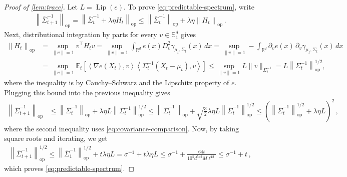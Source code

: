\documentclass[11pt]{article}
\newcommand{\R}{\mathbb R}
\newcommand{\E}{\mathbb E}
\newcommand{\Lip}{\operatorname{Lip}}
\newcommand{\op}{\mathrm{op}}
\newcommand{\1}{\mathbf 1}
\newcommand{\ip}[2]{\left\langle #1,#2\right\rangle}
\newcommand{\norm}[1]{\left\lVert #1\right\rVert}
\begin{document}
\begin{proof}[Proof of \cref{lem:trace}]
    Let $L=\Lip(e)$.
    To prove \eqref{eq:predictable-spectrum}, write
    \begin{align}
        \norm{\overline\Sigma_{t+1}^{-1}}_{\op}
        =
        \norm{\overline\Sigma_{t}^{-1} + \lambda\eta H_t}_{\op}
        \leq
        \norm{\overline\Sigma_{t}^{-1}}_{\op} + \lambda\eta\norm{H_t}_{\op}\,.
    \end{align}
    Next, distributional integration by parts for every $v\in\mathbb{S}_1^d$ gives
    \begin{align}
        \norm{H_t}_{\op}
         & =
        \sup_{\|v\|=1} v^\top H_t v
        =
        \sup_{\|v\|=1}
        \int_{\R^d}e(x) D^2_v\gamma_{\mu_t,\Sigma_t}(x)\,dx
        =
        \sup_{\|v\|=1}
        -\int_{\R^d}\partial_ve(x)\,
        \partial_v\gamma_{\mu_t,\Sigma_t}(x)\,dx
        \\
         & =
        \sup_{\|v\|=1}
        \E_t\left[
            \ip{\nabla e(X_t)}{v}
            \ip{\Sigma_t^{-1}(X_t-\mu_t)}{v}
            \right]
        \leq
        \sup_{\|v\|=1}
        L \|v\|_{\Sigma_t^{-1}}
        =
        L \norm{\Sigma_t^{-1}}_{\op}^{1/2},
        \label{eq:H-quadratic-bound}
    \end{align}
    where the inequality is by Cauchy--Schwarz and the Lipschitz property of $e$.
    Plugging this bound into the previous inequality gives
    \begin{align}
        \norm{\overline\Sigma_{t+1}^{-1}}_{\op}
         & \leq
        \norm{\overline\Sigma_{t}^{-1}}_{\op} + \lambda\eta L \norm{\Sigma_t^{-1}}_{\op}^{1/2}
        \leq
        \norm{\overline\Sigma_{t}^{-1}}_{\op} + \sqrt{\frac{3}{2}}\lambda\eta L\norm{\overline\Sigma_{t}^{-1}}_{\op}^{1/2}
        \leq
        \left(\norm{\overline\Sigma_{t}^{-1}}_{\op}^{1/2} + \lambda\eta L\right)^2\,,
        \label{eq:predictable-spectrum-bound}
    \end{align}
    where the second inequality uses \eqref{eq:covariance-comparison}.
    Now, by taking square roots and iterating, we get
    \begin{align}
        \norm{\overline\Sigma_{t+1}^{-1}}_{\op}^{1/2}
        \leq
        \norm{\overline\Sigma_1^{-1}}_{\op}^{1/2} + t\lambda\eta L
        = \sigma^{-1}+t\lambda\eta L
        \leq
        \sigma^{-1}
        +\frac{64t}{10^5d^{5/2}M\ell^{12}}
        \leq
        \sigma^{-1} + t\,,
    \end{align}
    which proves \eqref{eq:predictable-spectrum}.



\end{proof}
\end{document}

